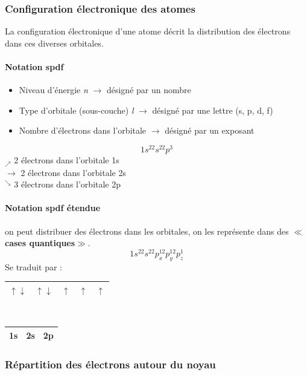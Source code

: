 \documentclass[10pt,a4paper]{book}
\begin{document}
\subsubsection{Configuration électronique des atomes}

La configuration électronique d'une atome décrit la distribution des électrons dans ces diverses orbitales.
\paragraph{Notation spdf}
\begin{itemize}
\item Niveau d'énergie \textit{n} $\rightarrow$ désigné par un nombre
\item Type d'orbitale (sous-couche) \textit{l} $\rightarrow$ désigné par une lettre (s, p, d, f)
\item Nombre d'électrons dans l'orbitale $\rightarrow$ désigné par un exposant
\end{itemize}
\begin{displaymath}
1s^22s^22p^3
\end{displaymath}
$_\nearrow$ 2 électrons dans l'orbitale 1s \\
$\rightarrow$ 2 électrons dans l'orbitale 2s \\
$^\searrow$ 3 électrons dans l'orbitale 2p 
\paragraph{Notation spdf étendue} on peut distribuer des électrons dans les orbitales, on les représente dans des $\ll$\textbf{cases quantiques}$\gg$.
\begin{displaymath}
1s^22s^22p_x^12p_y^12p_z^1
\end{displaymath}
Se traduit par :
\begin{center}
\begin{tabular}{| c | c | c | c | c |}
\hline
$\uparrow\downarrow$ & $\uparrow\downarrow$ & $\uparrow$ & $\uparrow$  & $\uparrow$ \\
\hline
\end{tabular} \\
\begin{tabular}{| c | c | m{1.5cm}|}
\hline
1s & 2s & 2p \\
\hline
\end{tabular}
\end{center}

\subsubsection{Répartition des électrons autour du noyau}
\end{document}

